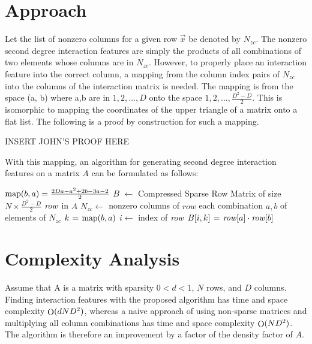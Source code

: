 \documentclass[11pt]{article}
\begin{document}

\section{Approach}
Let the list of nonzero columns for a given row $\vec{x}$ be denoted by $N_{zc}$. The nonzero second degree 
interaction features are simply the products of all combinations of two elements whose 
columns are in $N_{zc}$. However, to properly place an interaction feature into the correct column, a mapping from the column 
index pairs of $N_{zc}$ into the columns of the interaction matrix is needed. The mapping is 
from the space (a, b) where a,b are in $1,2,..., D$ onto the space $1,2,..., \frac{D^2-D}{2}$. This 
is isomorphic to mapping the coordinates of the upper triangle of a matrix onto a flat 
list. The following is a proof by construction for such a mapping.

INSERT JOHN'S PROOF HERE

With this mapping, an algorithm for generating second degree interaction features on a 
matrix $A$ can be formulated as follows:

\begin{codebox}
    \zi $\func{map}(b, a) = \frac{2Da-a^2+2b-3a-2}{2}$
    \zi $B$ $\gets$ Compressed Sparse Row Matrix of size $N \times \frac{D^2-D}{2}$
    \zi \For $\id{row}$ in $A$ \Do
    \zi     $N_{zc} \gets$ nonzero columns of $row$
    \zi     \For each combination $a, b$ of elements of $N_{zc}$ \Do
    \zi         $k \gets \func{map}(b, a)$
    \zi         $i \gets$ index of $\id{row}$
    \zi         $B[i, k] \gets \id{row}[a] \cdot \id{row}[b]$
            \End
       	\End
\end{codebox}

\section{Complexity Analysis}
Assume that A is a matrix with sparsity $0 < d < 1$, $N$ rows, and $D$ columns. Finding 
interaction features with the proposed algorithm has time and space complexity 
$\func{O}(d N D^2)$, 
whereas a naive approach of using non-sparse matrices and multiplying all column 
combinations has time and space complexity $\func{O}(N D^2)$. The algorithm is therefore an 
improvement by a factor of the density factor of $A$.
\end{document}
